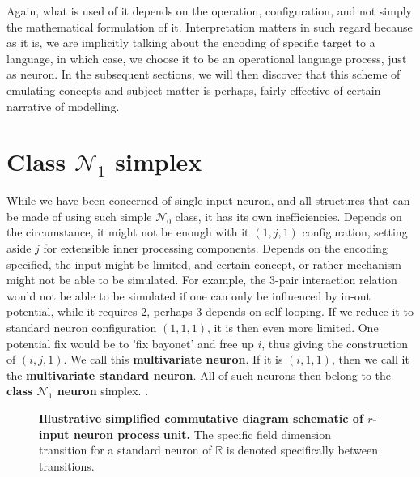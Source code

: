 Again, what is used of it depends on the operation, configuration, and not simply the mathematical formulation of it. Interpretation matters in such regard because as it is, we are implicitly talking about the encoding of specific target to a language, in which case, we choose it to be an operational language process, just as neuron. In the subsequent sections, we will then discover that this scheme of emulating concepts and subject matter is perhaps, fairly effective of certain narrative of modelling.

\section{Class $\mathcal{N}_{1}$ simplex}
While we have been concerned of single-input neuron, and all structures that can be made of using such simple $\mathcal{N}_{0}$ class, it has its own inefficiencies. Depends on the circumstance, it might not be enough with it $(1,j,1)$ configuration, setting aside $j$ for extensible inner processing components. Depends on the encoding specified, the input might be limited, and certain concept, or rather mechanism might not be able to be simulated. For example, the 3-pair interaction relation would not be able to be simulated if one can only be influenced by in-out potential, while it requires 2, perhaps 3 depends on self-looping. If we reduce it to standard neuron configuration $(1,1,1)$, it is then even more limited. One potential fix would be to 'fix bayonet' and free up $i$, thus giving the construction of $(i,j,1)$. We call this \textbf{multivariate neuron}. If it is $(i,1,1)$, then we call it the \textbf{multivariate standard neuron}. All of such neurons then belong to the \textbf{class $\mathcal{N}_{1}$ neuron} simplex. . 

\begin{figure}[!htp]
    \centering
    \caption{\textbf{Illustrative simplified commutative diagram schematic of $r$-input neuron process unit.} The specific field dimension transition for a standard neuron of $\mathbb{R}$ is denoted specifically between transitions.}
\end{figure}

